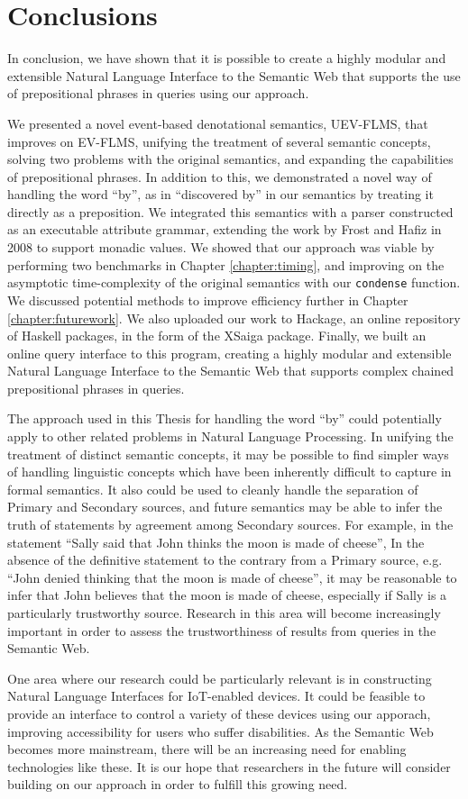 \documentclass[../main.tex]{subfiles}
\begin{document}
\chapter{Conclusions}

In conclusion, we have shown that it is possible to create a highly modular and extensible Natural Language Interface to the Semantic Web that supports the use of prepositional phrases in queries using our approach.

We presented a novel event-based denotational semantics, UEV-FLMS, that improves on EV-FLMS, unifying
the treatment of several semantic concepts, solving two problems with the original semantics, and expanding the capabilities of prepositional phrases.
In addition to this, we demonstrated a novel way of handling the word ``by'', as in ``discovered by'' in our semantics by treating it directly as a preposition.
We integrated this semantics with a parser constructed as an executable attribute grammar, extending the work by Frost and Hafiz in 2008\cite{frosthafiz2008} to support
monadic values.  We showed that our approach was viable by performing two benchmarks in Chapter \ref{chapter:timing}, and improving on the asymptotic time-complexity of the original semantics with our \texttt{condense} function.  We discussed potential methods to improve efficiency further in Chapter \ref{chapter:futurework}.  We also uploaded our work to Hackage, an online repository of Haskell packages, in the form of the XSaiga package.  Finally, we built an online query interface to this program, creating a highly modular and extensible Natural Language Interface to the Semantic Web that supports complex chained prepositional phrases in queries.

The approach used in this Thesis for handling the word ``by'' could potentially apply to other related problems in Natural Language Processing.
In unifying the treatment of distinct semantic concepts, it may be possible to find simpler ways of handling linguistic concepts which have been inherently difficult
to capture in formal semantics.  It also could be used to cleanly handle the separation of Primary and Secondary sources, and future semantics may be able to infer
the truth of statements by agreement among Secondary sources.  For example, in the statement ``Sally said that John thinks the moon is made of cheese'',
In the absence of the definitive statement to the contrary from a Primary source, e.g. ``John denied thinking that the moon is made of cheese'', it may be reasonable
to infer that John believes that the moon is made of cheese, especially if Sally is a particularly trustworthy source.  Research in this area will
become increasingly important in order to assess the trustworthiness of results from queries in the Semantic Web.

One area where our research could be particularly relevant is in constructing Natural Language Interfaces for IoT-enabled devices.  It could be feasible to provide an interface to control a variety of these devices using our apporach, improving accessibility for users who suffer disabilities.  As the Semantic Web becomes more mainstream, there will be an increasing need for enabling technologies like these.  It is our hope that researchers in the future will consider building on our approach in order to fulfill this growing need.
\end{document}
